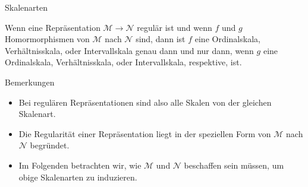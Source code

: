 \documentclass[
  8pt,
  ignorenonframetext,
]{beamer}
\providecommand{\tightlist}{%
  \setlength{\itemsep}{0pt}\setlength{\parskip}{0pt}}
\begin{document}
\begin{frame}{Skalenarten}
\protect\hypertarget{skalenarten-5}{}
\small
\begin{theorem}[Skalenart]
\justifying
\normalfont
Wenn eine Repräsentation $\mathcal{M} \to  \mathcal{N}$ regulär ist und wenn
$f$ und $g$ Homormorphismen von $\mathcal{M}$ nach $\mathcal{N}$ sind, dann ist 
$f$ eine Ordinalskala, Verhältnisskala, oder Intervallskala genau dann und nur 
dann, wenn $g$ eine Ordinalskala, Verhältnisskala, oder Intervallskala, respektive, ist.
\end{theorem}
\footnotesize

Bemerkungen

\begin{itemize}
\tightlist
\item
  Bei regulären Repräsentationen sind also alle Skalen von der gleichen
  Skalenart.
\item
  Die Regularität einer Repräsentation liegt in der speziellen Form von
  \(\mathcal{M}\) nach \(\mathcal{N}\) begründet.
\item
  Im Folgenden betrachten wir, wie \(\mathcal{M}\) und \(\mathcal{N}\)
  beschaffen sein müssen, um obige Skalenarten zu induzieren.
\end{itemize}
\end{frame}
\end{document}
